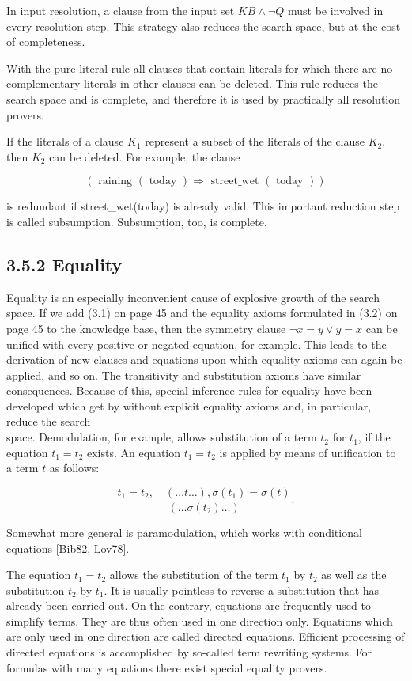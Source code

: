 \documentclass[10pt]{article}
\begin{document}
In input resolution, a clause from the input set $K B \wedge \neg Q$ must be involved in every resolution step. This strategy also reduces the search space, but at the cost of completeness.

With the pure literal rule all clauses that contain literals for which there are no complementary literals in other clauses can be deleted. This rule reduces the search space and is complete, and therefore it is used by practically all resolution provers.

If the literals of a clause $K_{1}$ represent a subset of the literals of the clause $K_{2}$, then $K_{2}$ can be deleted. For example, the clause

$$
(\text { raining }(\text { today }) \Rightarrow \text { street_wet }(\text { today }))
$$

is redundant if street\_wet(today) is already valid. This important reduction step is called subsumption. Subsumption, too, is complete.

\subsection*{3.5.2 Equality}
Equality is an especially inconvenient cause of explosive growth of the search space. If we add (3.1) on page 45 and the equality axioms formulated in (3.2) on page 45 to the knowledge base, then the symmetry clause $\neg x=y \vee y=x$ can be unified with every positive or negated equation, for example. This leads to the derivation of new clauses and equations upon which equality axioms can again be applied, and so on. The transitivity and substitution axioms have similar consequences. Because of this, special inference rules for equality have been developed which get by without explicit equality axioms and, in particular, reduce the search\\
space. Demodulation, for example, allows substitution of a term $t_{2}$ for $t_{1}$, if the equation $t_{1}=t_{2}$ exists. An equation $t_{1}=t_{2}$ is applied by means of unification to a term $t$ as follows:


$$
\frac{t_{1}=t_{2}, \quad(\ldots t \ldots), \sigma\left(t_{1}\right)=\sigma(t)}{\left(\ldots \sigma\left(t_{2}\right) \ldots\right)} .
$$

Somewhat more general is paramodulation, which works with conditional equations [Bib82, Lov78].

The equation $t_{1}=t_{2}$ allows the substitution of the term $t_{1}$ by $t_{2}$ as well as the substitution $t_{2}$ by $t_{1}$. It is usually pointless to reverse a substitution that has already been carried out. On the contrary, equations are frequently used to simplify terms. They are thus often used in one direction only. Equations which are only used in one direction are called directed equations. Efficient processing of directed equations is accomplished by so-called term rewriting systems. For formulas with many equations there exist special equality provers.
\end{document}

